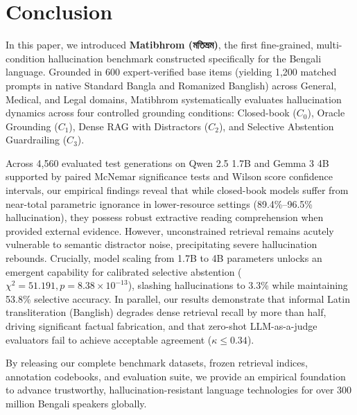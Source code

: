 \section{Conclusion}
\label{sec:conclusion}

In this paper, we introduced \textbf{Matibhrom (\foreignlanguage{bengali}{মতিভ্রম})}, the first fine-grained, multi-condition hallucination benchmark constructed specifically for the Bengali language. Grounded in 600 expert-verified base items (yielding 1,200 matched prompts in native Standard Bangla and Romanized Banglish) across General, Medical, and Legal domains, Matibhrom systematically evaluates hallucination dynamics across four controlled grounding conditions: Closed-book ($C_0$), Oracle Grounding ($C_1$), Dense RAG with Distractors ($C_2$), and Selective Abstention Guardrailing ($C_3$).

Across 4,560 evaluated test generations on Qwen 2.5 1.7B and Gemma 3 4B supported by paired McNemar significance tests and Wilson score confidence intervals, our empirical findings reveal that while closed-book models suffer from near-total parametric ignorance in lower-resource settings (89.4\%--96.5\% hallucination), they possess robust extractive reading comprehension when provided external evidence. However, unconstrained retrieval remains acutely vulnerable to semantic distractor noise, precipitating severe hallucination rebounds. Crucially, model scaling from 1.7B to 4B parameters unlocks an emergent capability for calibrated selective abstention ($\chi^2 = 51.191, p = 8.38 \times 10^{-13}$), slashing hallucinations to 3.3\% while maintaining 53.8\% selective accuracy. In parallel, our results demonstrate that informal Latin transliteration (Banglish) degrades dense retrieval recall by more than half, driving significant factual fabrication, and that zero-shot LLM-as-a-judge evaluators fail to achieve acceptable agreement ($\kappa \le 0.34$). 

By releasing our complete benchmark datasets, frozen retrieval indices, annotation codebooks, and evaluation suite, we provide an empirical foundation to advance trustworthy, hallucination-resistant language technologies for over 300 million Bengali speakers globally.
